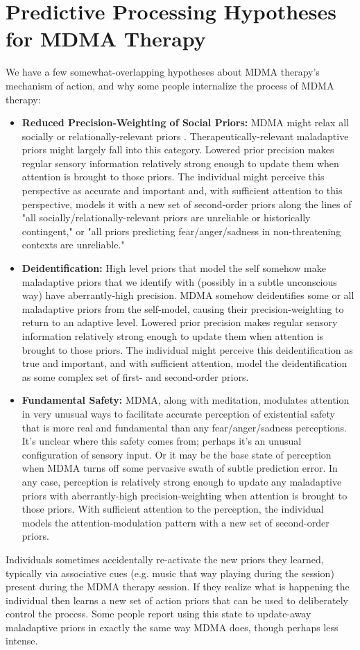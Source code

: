 \documentclass[12pt,letterpaper]{book}
\begin{document}
\chapter{Predictive Processing Hypotheses for MDMA Therapy}
\label{ppHypotheses}
We have a few somewhat-overlapping hypotheses about MDMA therapy's mechanism of action, and why some people internalize the process of MDMA therapy:
\begin{itemize}
    \item \textbf{Reduced Precision-Weighting of Social Priors:} MDMA might relax all socially or relationally-relevant priors \cite{carhart2019rebus}. Therapeutically-relevant maladaptive priors might largely fall into this category. Lowered prior precision makes regular sensory information relatively strong enough to update them when attention is brought to those priors. The individual might perceive this perspective as accurate and important and, with sufficient attention to this perspective, models it with a new set of second-order priors along the lines of "all socially/relationally-relevant priors are unreliable or historically contingent," or "all priors predicting fear/anger/sadness in non-threatening contexts are unreliable."
    \item \textbf{Deidentification:} High level priors that model the self somehow make maladaptive priors that we identify with (possibly in a subtle unconscious way) have aberrantly-high precision. MDMA somehow deidentifies some or all maladaptive priors from the self-model, causing their precision-weighting to return to an adaptive level. Lowered prior precision makes regular sensory information relatively strong enough to update them when attention is brought to those priors. The individual might perceive this deidentification as true and important, and with sufficient attention, model the deidentification as some complex set of first- and second-order priors.
    \item \textbf{Fundamental Safety:} MDMA, along with meditation, modulates attention in very unusual ways to facilitate accurate perception of existential safety that is more real and fundamental than any fear/anger/sadness perceptions. It's unclear where this safety comes from; perhaps it's an unusual configuration of sensory input. Or it may be the base state of perception when MDMA turns off some pervasive swath of subtle prediction error. In any case, perception is relatively strong enough to update any maladaptive priors with aberrantly-high precision-weighting when attention is brought to those priors. With sufficient attention to the perception, the individual models the attention-modulation pattern with a new set of second-order priors.
\end{itemize}
Individuals sometimes accidentally re-activate the new priors they learned, typically via associative cues (e.g. music that way playing during the session) present during the MDMA therapy session. If they realize what is happening the individual then learns a new set of action priors that can be used to deliberately control the process. Some people report using this state to update-away maladaptive priors in exactly the same way MDMA does, though perhaps less intense.
\end{document}
